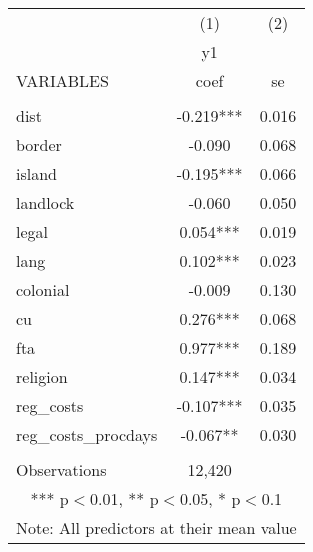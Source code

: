 \documentclass[]{article}
\begin{document}
\begin{tabular}{lcc} \hline
 & (1) & (2) \\
 & y1 &  \\
VARIABLES & coef & se \\ \hline
 &  &  \\
dist & -0.219*** & 0.016 \\
border & -0.090 & 0.068 \\
island & -0.195*** & 0.066 \\
landlock & -0.060 & 0.050 \\
legal & 0.054*** & 0.019 \\
lang & 0.102*** & 0.023 \\
colonial & -0.009 & 0.130 \\
cu & 0.276*** & 0.068 \\
fta & 0.977*** & 0.189 \\
religion & 0.147*** & 0.034 \\
reg\_costs & -0.107*** & 0.035 \\
reg\_costs\_procdays & -0.067** & 0.030 \\
 &  &  \\
 Observations & 12,420 &  \\ \hline
\multicolumn{3}{c}{ *** p$<$0.01, ** p$<$0.05, * p$<$0.1} \\
\multicolumn{3}{c}{ Note: All predictors at their mean value} \\
\end{tabular}
\end{document}
